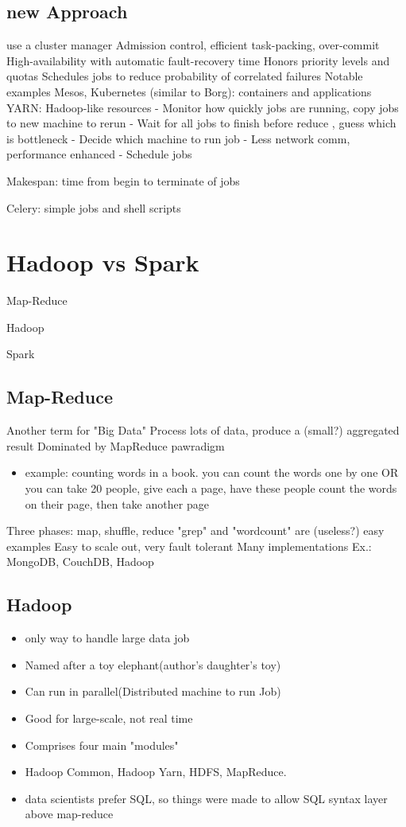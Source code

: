 \documentclass[fancy,11pt,titlestyle=display]{style/elegantbook}
\begin{document}
\section{new Approach}
use a cluster manager
Admission control, efficient task-packing, over-commit
High-availability with automatic fault-recovery time
Honors priority levels and quotas
Schedules jobs to reduce probability of correlated failures
Notable examples
Mesos, Kubernetes (similar to Borg): containers and applications
YARN: Hadoop-like resources
-	Monitor how quickly jobs are running, copy jobs to new machine to rerun
-	Wait for all jobs to finish before reduce , guess which is bottleneck
-	Decide which machine to run job
-	Less network comm, performance enhanced
-	Schedule jobs

Makespan: time from begin to terminate of jobs

Celery: simple jobs and shell scripts

\chapter{Hadoop vs Spark}
\begin{introduction}[Topics]
\item Map-Reduce
\item Hadoop
\item Spark
\end{introduction}

\section{Map-Reduce}
Another term for "Big Data"
Process lots of data, produce a (small?) aggregated result
Dominated by MapReduce pawradigm
\begin{itemize}
    \item example: counting words in a book. you can count the words one by one OR you can take 20 people, give each a page, have these people count the words on their page, then take another page
\end{itemize}
Three phases: map, shuffle, reduce
"grep" and "wordcount" are (useless?) easy examples
Easy to scale out, very fault tolerant
Many implementations
Ex.: MongoDB, CouchDB, Hadoop


\section{Hadoop}
\begin{itemize}
    \item only way to handle large data job
    \item Named after a toy elephant(author's daughter's toy)
    \item Can run in parallel(Distributed machine to run Job)
    \item Good for large-scale, not real time
    \item Comprises four main "modules"
    \item Hadoop Common, Hadoop Yarn, HDFS, MapReduce.
    \item data scientists prefer SQL, so things were made to allow SQL syntax layer above map-reduce
\end{itemize}
\end{document}
